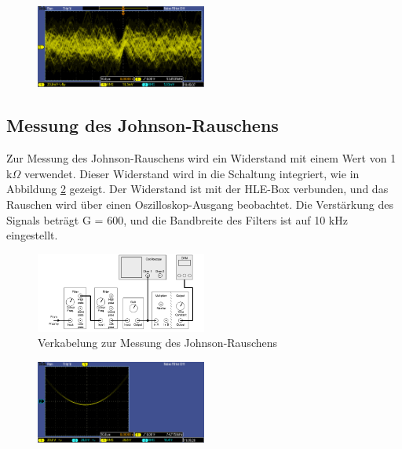\begin{figure}[htbp]
    \centering
    \includegraphics[width=0.5\textwidth]{figs/johnson noise with bandfilter.PNG}
    \caption{}
    \label{fig:bandfilter}
\end{figure}
\FloatBarrier
\subsection{Messung des Johnson-Rauschens}
Zur Messung des Johnson-Rauschens wird ein Widerstand mit einem Wert von 1 k$\Omega$ verwendet. Dieser Widerstand wird in die Schaltung integriert, wie in Abbildung \ref{fig:johnson messung} gezeigt. Der Widerstand ist mit der HLE-Box verbunden, und das Rauschen wird über einen Oszilloskop-Ausgang beobachtet. Die Verstärkung des Signals beträgt G = 600, und die Bandbreite des Filters ist auf 10 kHz eingestellt.
\FloatBarrier
\begin{figure}[htbp]
    \centering
    \includegraphics[width=0.5\textwidth]{figs/johnson hle and dmm.png}
    \caption{Verkabelung zur Messung des Johnson-Rauschens \cite{praktikum}}
    \label{fig:johnson messung}
\end{figure}
\FloatBarrier

\begin{figure}[htbp]
    \centering
    \includegraphics[width=0.5\textwidth]{figs/johnson parabel.png}
    \caption{}
    \label{fig:parabel}
\end{figure}
\FloatBarrier

